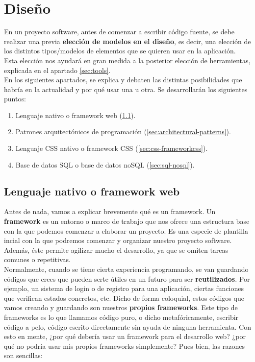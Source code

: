 \chapter{Diseño}
En un proyecto software, antes de comenzar a escribir código fuente, se debe realizar una
previa \textbf{elección de modelos en el diseño}, es decir, una elección de los distintos 
tipos/modelos de elementos que se quieren usar en la aplicación. Esta elección nos ayudará
en gran medida a la posterior elección de herramientas, explicada en el apartado
\ref{sec:tools}.\\

En los siguientes apartados, se explica y debaten las distintas posibilidades que habría en
la actualidad y por qué usar una u otra. Se desarrollarán los siguientes puntos:

    \begin{enumerate}
        \item Lenguaje nativo o framework web (\ref{sec:language-webframework}).
        \item Patrones arquitectónicos de programación (\ref{sec:architectural-patterns}).
        \item Lenguaje CSS nativo o framework CSS (\ref{sec:css-frameworkcss}).
        \item Base de datos SQL o base de datos noSQL (\ref{sec:sql-nosql}).
    \end{enumerate}

\section{Lenguaje nativo o framework web} \label{sec:language-webframework}
Antes de nada, vamos a explicar brevemente qué es un framework. Un \textbf{framework} es
un entorno o marco de trabajo que nos ofrece una estructura base con la que podemos
comenzar a elaborar un proyecto. Es una especie de plantilla incial con la que podremos
comenzar y organizar nuestro proyecto software. Además, éste permite agilizar mucho
el desarrollo, ya que se omiten tareas comunes o repetitivas.\\

Normalmente, cuando se tiene cierta experiencia programando, se van guardando códigos que
crees que pueden serte útiles en un futuro para ser \textbf{reutilizados}. Por ejemplo, un
sistema de login o de registro para una aplicación, ciertas funciones que verifican estados
concretos, etc. Dicho de forma coloquial, estos códigos que vamos creando y guardando son
nuestros \textbf{propios frameworks}. Este tipo de frameworks es lo que llamamos código
puro, o dicho metafóricamente, escribir código a pelo, código escrito directamente sin
ayuda de ninguna herramienta. Con esto en mente, ¿por qué debería usar un framework para
el desarrollo web? ¿por qué no podría usar mis propios frameworks simplemente? Pues bien,
las razones son sencillas:

